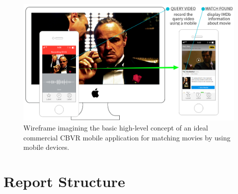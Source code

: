 \begin{figure}[ht]
\centerline{\includegraphics[width=1.15\textwidth]{figures/introduction/system_wireframe.png}}
\caption{\label{fig:wireframe}Wireframe imagining the basic high-level concept of an ideal commercial CBVR mobile application for matching movies by using mobile devices.}
\end{figure}


\section{Report Structure}

